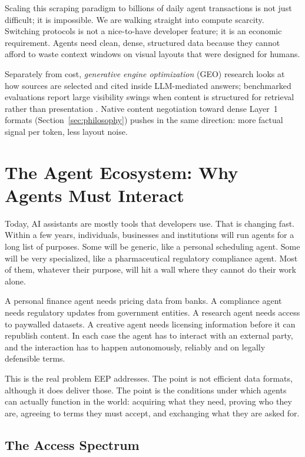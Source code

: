 \documentclass[12pt,a4paper]{article}
\begin{document}
Scaling this scraping paradigm to billions of daily agent transactions is not just difficult; it is impossible. We are walking straight into compute scarcity. Switching protocols is not a nice-to-have developer feature; it is an economic requirement. Agents need clean, dense, structured data because they cannot afford to waste context windows on visual layouts that were designed for humans.

Separately from cost, \emph{generative engine optimization} (GEO) research looks at how sources are selected and cited inside LLM-mediated answers; benchmarked evaluations report large visibility swings when content is structured for retrieval rather than presentation \cite{ref33}. Native content negotiation toward dense Layer~1 formats (Section~\ref{sec:philosophy}) pushes in the same direction: more factual signal per token, less layout noise.

\section{The Agent Ecosystem: Why Agents Must Interact}

Today, AI assistants are mostly tools that developers use. That is changing fast. Within a few years, individuals, businesses and institutions will run agents for a long list of purposes. Some will be generic, like a personal scheduling agent. Some will be very specialized, like a pharmaceutical regulatory compliance agent. Most of them, whatever their purpose, will hit a wall where they cannot do their work alone.

A personal finance agent needs pricing data from banks. A compliance agent needs regulatory updates from government entities. A research agent needs access to paywalled datasets. A creative agent needs licensing information before it can republish content. In each case the agent has to interact with an external party, and the interaction has to happen autonomously, reliably and on legally defensible terms.

This is the real problem EEP addresses. The point is not efficient data formats, although it does deliver those. The point is the conditions under which agents can actually function in the world: acquiring what they need, proving who they are, agreeing to terms they must accept, and exchanging what they are asked for.

\subsection{The Access Spectrum}
\end{document}
